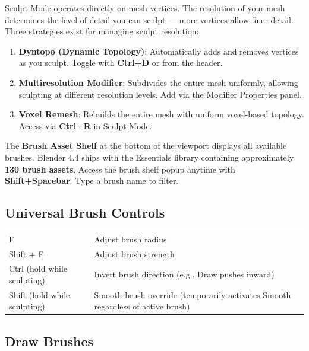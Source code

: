 Sculpt Mode operates directly on mesh vertices. The resolution of your mesh determines the level of detail you can sculpt --- more vertices allow finer detail. Three strategies exist for managing sculpt resolution:

\begin{enumerate}[leftmargin=2em]
  \item \textbf{Dyntopo (Dynamic Topology)}: Automatically adds and removes vertices as you sculpt. Toggle with \textbf{Ctrl+D} or from the header.
  \item \textbf{Multiresolution Modifier}: Subdivides the entire mesh uniformly, allowing sculpting at different resolution levels. Add via the Modifier Properties panel.
  \item \textbf{Voxel Remesh}: Rebuilds the entire mesh with uniform voxel-based topology. Access via \textbf{Ctrl+R} in Sculpt Mode.
\end{enumerate}

The \textbf{Brush Asset Shelf} at the bottom of the viewport displays all available brushes. Blender 4.4 ships with the Essentials library containing approximately \textbf{130 brush assets}. Access the brush shelf popup anytime with \textbf{Shift+Spacebar}. Type a brush name to filter.

\subsection{Universal Brush Controls}

\begin{shortcutbox}
\begin{center}
\begin{tabularx}{\textwidth}{L{4cm}X}
\toprule
{}
 &  \\
\midrule
F & Adjust brush radius \\
Shift + F & Adjust brush strength \\
Ctrl (hold while sculpting) & Invert brush direction (e.g., Draw pushes inward) \\
Shift (hold while sculpting) & Smooth brush override (temporarily activates Smooth regardless of active brush) \\
\bottomrule
\end{tabularx}
\end{center}
\end{shortcutbox}

\subsection{Draw Brushes}
\label{sec:drawbrushes}

